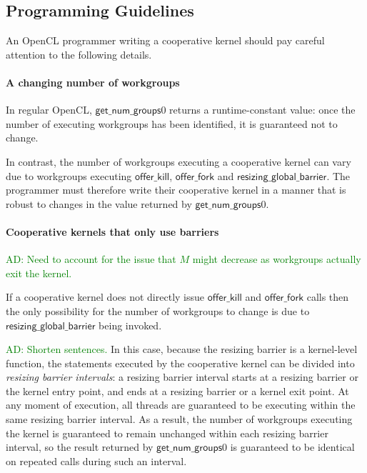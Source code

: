 \documentclass[nocopyrightspace]{sigplanconf-pldi16}
\newcommand{\ADComment}[1]{\textcolor{green}{AD: #1}}
\newcommand{\offerfork}{\mathsf{offer\_fork}}
\newcommand{\offerkill}{\mathsf{offer\_kill}}
\newcommand{\resizingglobalbarrier}{\mathsf{resizing\_global\_barrier}}
\newcommand{\getnumgroups}{\mathsf{get\_num\_groups}}
\begin{document}
\subsection{Programming Guidelines}\label{sec:programmingguidelines}

An OpenCL programmer writing a cooperative kernel should pay careful
attention to the following details.

\paragraph{A changing number of workgroups}

In regular OpenCL, $\getnumgroups{0}$ returns a runtime-constant
value: once the number of executing workgroups has been identified, it
is guaranteed not to change.

In contrast, the number of workgroups executing a cooperative kernel
can vary due to workgroups executing $\offerkill$, $\offerfork$ and
$\resizingglobalbarrier$.  The programmer must therefore write their
cooperative kernel in a manner that is robust to changes in the value
returned by $\getnumgroups{0}$.

\paragraph{Cooperative kernels that only use barriers}

\ADComment{Need to account for the issue that $M$ might decrease as
  workgroups actually exit the kernel.}

If a cooperative kernel does not directly issue $\offerkill$ and
$\offerfork$ calls then the only possibility for the number of
workgroups to change is due to $\resizingglobalbarrier$ being invoked.

\ADComment{Shorten sentences.}
In this case, because the resizing barrier is a kernel-level function,
the statements executed by the cooperative kernel can be divided into
\emph{resizing barrier intervals}: a resizing barrier interval starts
at a resizing barrier or the kernel entry point, and ends at a
resizing barrier or a kernel exit point.  At any moment of execution,
all threads are guaranteed to be executing within the same resizing
barrier interval.  As a result, the number of workgroups executing the
kernel is guaranteed to remain unchanged within each resizing barrier
interval, so the result returned by $\getnumgroups{0}$ is guaranteed
to be identical on repeated calls during such an interval.
\end{document}
